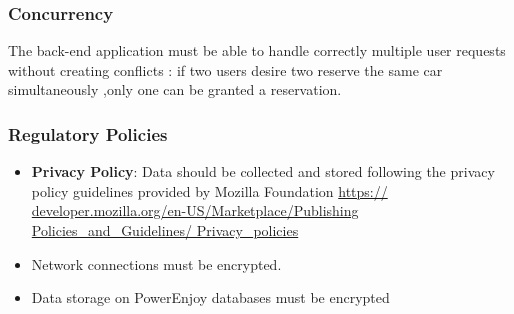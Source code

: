 \documentclass[12pt]{article}
\begin{document}
		\subsubsection{Concurrency}
		The back-end application must be able to handle correctly multiple user requests 
		without creating conflicts : if two users desire two reserve the same car 
		simultaneously ,only one can be granted a reservation.
		
		\subsubsection{Regulatory Policies}
		\begin{itemize}
			\item \textbf{Privacy Policy}: Data should be collected and stored following the 
			  privacy policy guidelines provided by Mozilla Foundation \url{https://
			  developer.mozilla.org/en-US/Marketplace/Publishing Policies_and_Guidelines/
			  Privacy_policies}
			\item Network connections must be encrypted.
			\item Data storage on PowerEnjoy databases must be encrypted
		\end{itemize}
		
\end{document}
